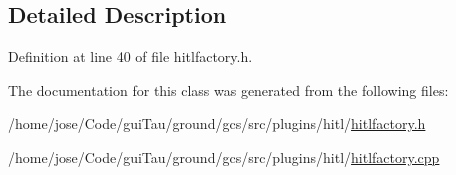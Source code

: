 \subsection{Detailed Description}


Definition at line 40 of file hitlfactory.\-h.



The documentation for this class was generated from the following files\-:\begin{DoxyCompactItemize}
\item 
/home/jose/\-Code/gui\-Tau/ground/gcs/src/plugins/hitl/\hyperlink{hitlfactory_8h}{hitlfactory.\-h}\item 
/home/jose/\-Code/gui\-Tau/ground/gcs/src/plugins/hitl/\hyperlink{hitlfactory_8cpp}{hitlfactory.\-cpp}\end{DoxyCompactItemize}

